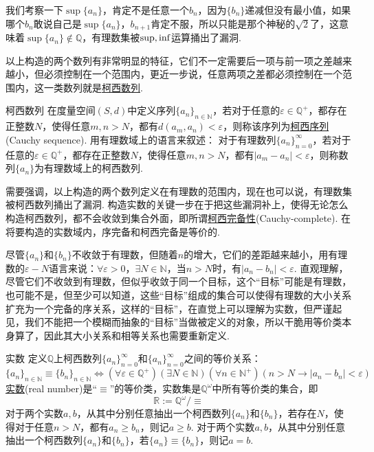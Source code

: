 \documentclass[main.tex]{subfiles}
\begin{document}
我们考察一下\(\sup\{a_n\}\)，肯定不是任意一个\(b_n\)，因为\(\{b_n\}\)递减但没有最小值，如果哪个\(b_n\)敢说自己是\(\sup\{a_n\}\)，\(b_{n+1}\)肯定不服，所以只能是那个神秘的\(\sqrt{2}\)了，这意味着\(\sup\{a_n\}\not \in \mathbb{Q}\)，有理数集被\({\rm sup},{\rm inf}\)运算捅出了漏洞.

以上构造的两个数列有非常明显的特征，它们不一定需要后一项与前一项之差越来越小，但必须控制在一个范围内，更近一步说，任意两项之差都必须控制在一个范围内，这一类数列就是\uline{柯西数列}.
\begin{definition}{柯西数列}
    在度量空间\((S,d)\)中定义序列\(\{a_n\}_{n\in \mathbb{N}}\)，若对于任意的\(\varepsilon \in \mathbb{Q}^+\)，都存在正整数\(N\)，使得任意\(m,n>N\)，都有\(d(a_{m},a_{n}) < \varepsilon\)，则称该序列为\uline{柯西序列}(Cauchy sequence).
    \newline
    用有理数域上的语言来叙述：
        对于有理数列\(\{a_n\}_{n=0}^{\infty}\)，若对于任意的\(\varepsilon \in \mathbb{Q}^+\)，都存在正整数\(N\)，使得任意\(m,n>N\)，都有\(|a_{m}-a_{n}| < \varepsilon\)，则称数列\(\{a_n\}\)为有理数域上的柯西数列.
\end{definition}
需要强调，以上构造的两个数列定义在有理数的范围内，现在也可以说，有理数集被柯西数列捅出了漏洞. 构造实数的关键一步在于把这些漏洞补上，使得无论怎么构造柯西数列，都不会收敛到集合外面，即所谓\uline{柯西完备性}(Cauchy-complete). 在将要构造的实数域内，序完备和柯西完备是等价的.

尽管\(\{a_n\}\)和\(\{b_n\}\)不收敛于有理数，但随着\(n\)的增大，它们的差距越来越小，用有理数的\(\varepsilon-N\)语言来说：\(\forall \varepsilon > 0\)，\(\exists N\in \mathbb{N}\)，当\(n > N\)时，有\(|a_n-b_n|<\varepsilon\). 直观理解，尽管它们不收敛到有理数，但似乎收敛于同一个目标，这个“目标”可能是有理数，也可能不是，但至少可以知道，这些“目标”组成的集合可以使得有理数的大小关系扩充为一个完备的序关系，这样的“目标”，在直觉上可以理解为实数，但严谨起见，我们不能把一个模糊而抽象的“目标”当做被定义的对象，所以干脆用等价类本身算了，因此其大小关系和相等关系也需要重新定义.

\begin{definition}{实数}
    定义\(\mathbb{Q}\)上柯西数列\(\{a_n\}_{n=0}^{\infty}\)和\(\{a_n\}_{n=0}^{\infty}\)之间的等价关系：
    \[\{a_n\}_{n \in \mathbb{N}} \equiv \{b_n\}_{n \in \mathbb{N}} \Leftrightarrow (\forall \varepsilon \in \mathbb{Q}^+)(\exists N \in \mathbb{N})(\forall n \in \mathbb{N}^+)(n > N \rightarrow |a_n-b_n|<\varepsilon)\]
    \uline{实数}(real number)是“\(\equiv\)”的等价类，实数集是\(\mathbb{Q}^\omega\)中所有等价类的集合，即
    \[\mathbb{R} := \mathbb{Q}^\omega / \equiv\]
    对于两个实数\(a,b\)，从其中分别任意抽出一个柯西数列\(\{a_n\}\)和\(\{b_n\}\)，若存在\(N\)，使得对于任意\(n>N\)，都有\(a_n \geq b_n\)，则记\(a \geq b\).
    \newline
    对于两个实数\(a,b\)，从其中分别任意抽出一个柯西数列\(\{a_n\}\)和\(\{b_n\}\)，若\(\{a_n\} \equiv \{b_n\}\)，则记\(a=b\).
\end{definition}
\end{document}

